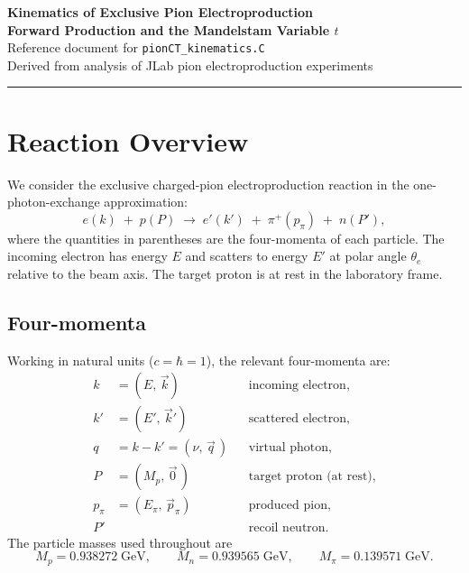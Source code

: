 \documentclass[12pt,a4paper]{article}
\begin{document}
\begin{center}
  {\LARGE\bfseries Kinematics of Exclusive Pion Electroproduction}\\[0.8em]
  {\large\bfseries Forward Production and the Mandelstam Variable $t$}\\[1.2em]
  {\normalsize Reference document for \texttt{pionCT\_kinematics.C}}\\[0.4em]
  {\small\color{gray} Derived from analysis of JLab pion electroproduction experiments}
\end{center}

\vspace{1em}
\hrule
\vspace{1.5em}

\tableofcontents

\newpage

\section{Reaction Overview}

We consider the exclusive charged-pion electroproduction reaction in the
one-photon-exchange approximation:
\begin{equation}
  e(k) \;+\; p(P) \;\longrightarrow\; e'(k') \;+\; \pi^+(p_\pi) \;+\; n(P'),
  \label{eq:reaction}
\end{equation}
where the quantities in parentheses are the four-momenta of each particle.
The incoming electron has energy $E$ and scatters to energy $E'$ at polar
angle $\theta_e$ relative to the beam axis. The target proton is at rest in
the laboratory frame.

\subsection{Four-momenta}

Working in natural units ($c = \hbar = 1$), the relevant four-momenta are:
\begin{align}
  k   &= (E,\, \vec{k})                  && \text{incoming electron,}\\
  k'  &= (E',\, \vec{k}')                && \text{scattered electron,}\\
  q   &= k - k' = (\nu,\, \vec{q}\,)    && \text{virtual photon,}\\
  P   &= (M_p,\, \vec{0}\,)             && \text{target proton (at rest),}\\
  p_\pi &= (E_\pi,\, \vec{p}_\pi)        && \text{produced pion,}\\
  P'  &                                  && \text{recoil neutron.}
\end{align}
The particle masses used throughout are
\begin{equation}
  M_p = 0.938272\;\text{GeV},\qquad
  M_n = 0.939565\;\text{GeV},\qquad
  M_\pi = 0.139571\;\text{GeV}.
\end{equation}
\end{document}
